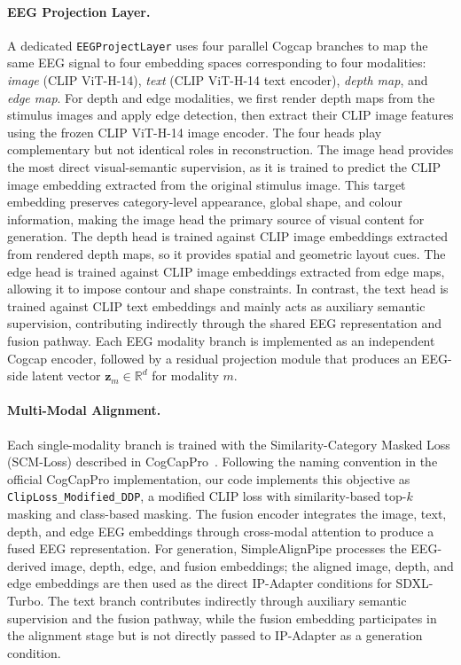 \documentclass[11pt]{article}
\begin{document}
\paragraph{EEG Projection Layer.}
A dedicated \texttt{EEGProjectLayer} uses four parallel Cogcap branches to map the same EEG signal to four embedding spaces corresponding to four modalities: \emph{image} (CLIP ViT-H-14), \emph{text} (CLIP ViT-H-14 text encoder), \emph{depth map}, and \emph{edge map}. 
For depth and edge modalities, we first render depth maps from the stimulus images and apply edge detection, then extract their CLIP image features using the frozen CLIP ViT-H-14 image encoder. 
The four heads play complementary but not identical roles in reconstruction.
The image head provides the most direct visual-semantic supervision, as it is trained to predict the CLIP image embedding extracted from the original stimulus image.
This target embedding preserves category-level appearance, global shape, and colour information, making the image head the primary source of visual content for generation.
The depth head is trained against CLIP image embeddings extracted from rendered depth maps, so it provides spatial and geometric layout cues.
The edge head is trained against CLIP image embeddings extracted from edge maps, allowing it to impose contour and shape constraints.
In contrast, the text head is trained against CLIP text embeddings and mainly acts as auxiliary semantic supervision, contributing indirectly through the shared EEG representation and fusion pathway.
Each EEG modality branch is implemented as an independent Cogcap encoder, followed by a residual projection module that produces an EEG-side latent vector $\mathbf{z}_m \in \mathbb{R}^{d}$ for modality $m$.

\paragraph{Multi-Modal Alignment.}
Each single-modality branch is trained with the Similarity-Category Masked Loss (SCM-Loss) described in CogCapPro~\citep{ccp2026}.
Following the naming convention in the official CogCapPro implementation, our code implements this objective as \texttt{ClipLoss\_Modified\_DDP}, a modified CLIP loss with similarity-based top-$k$ masking and class-based masking.
The fusion encoder integrates the image, text, depth, and edge EEG embeddings through cross-modal attention to produce a fused EEG representation.
For generation, SimpleAlignPipe processes the EEG-derived image, depth, edge, and fusion embeddings; the aligned image, depth, and edge embeddings are then used as the direct IP-Adapter conditions for SDXL-Turbo.
The text branch contributes indirectly through auxiliary semantic supervision and the fusion pathway, while the fusion embedding participates in the alignment stage but is not directly passed to IP-Adapter as a generation condition.
\end{document}

